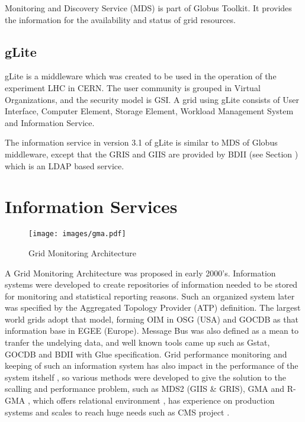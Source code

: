 
Monitoring and Discovery Service (MDS) is part of Globus Toolkit. It provides
the information for the availability and status of grid resources.

\subsection{gLite}

gLite is a middleware which was created to be used in the operation of the
experiment LHC in CERN. The user community is grouped in Virtual Organizations,
and the security model is GSI. A grid using gLite consists of User Interface,
Computer Element, Storage Element, Workload Management System and Information Service.

The information service in version 3.1 of gLite is similar to MDS of Globus
middleware, except that the GRIS and GIIS are provided by BDII (see Section
) which is an LDAP based service.


\section{Information Services}
\begin{figure}[htb]
\centering
 \texttt{[image: images/gma.pdf]}
\caption{Grid Monitoring Architecture}
\label{figure:gma}
\end{figure}
A Grid Monitoring Architecture \cite{tierney2002grid} was proposed in early
2000's. Information systems were developed to create repositories of information
needed to be stored for monitoring and statistical reporting reasons. Such an
organized system later was specified by the Aggregated Topology Provider (ATP)
definition. The largest world grids adopt that model, forming OIM in OSG (USA)
and GOCDB as that information base in EGEE (Europe). Message Bus was also
defined as a mean to tranfer the undelying data, and well known tools came up
such as Gstat, GOCDB and BDII with Glue specification. Grid performance
monitoring and keeping of such an information system has also impact in the
performance of the system itshelf \cite{zhang2003performance}, so various
methods were developed to give the solution to the scalling and performance
problem, such as MDS2 (GIIS \& GRIS), GMA and R-GMA
\cite{wilson2004information}, which offers relational environment
\cite{fisher2001relational}, has experience on production systems 
\cite{byrom-production} and scales to reach huge needs such as CMS project
\cite{Bonacorsi2004,Byrom}.

